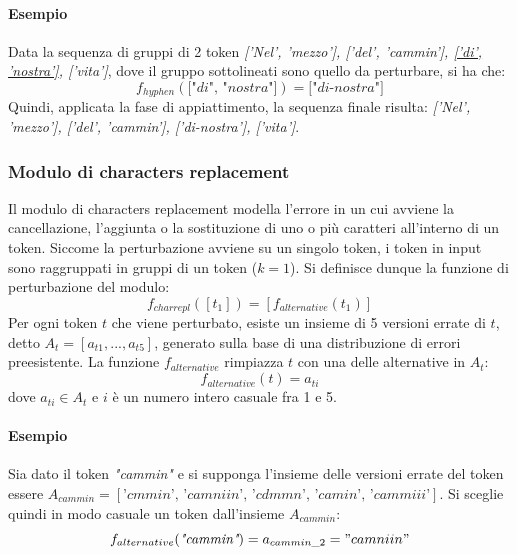 \paragraph{Esempio} Data la sequenza di gruppi di 2 token \textit{['Nel', 'mezzo'], ['del', 'cammin'], \underline{['di', 'nostra']}, ['vita']}, dove il gruppo sottolineati sono quello da perturbare, si ha che:
\begin{equation}
f_{hyphen}(\textit{["di", "nostra"]}) = \textit{["di-nostra"]}
\end{equation}
Quindi, applicata la fase di appiattimento, la sequenza finale risulta: \textit{['Nel', 'mezzo'], ['del', 'cammin'], {['di-nostra']}, ['vita']}.

\subsubsection{Modulo di characters replacement}
Il modulo di characters replacement modella l'errore in un cui avviene la cancellazione, l'aggiunta o la sostituzione di uno o più caratteri all'interno di un token. Siccome la perturbazione avviene su un singolo token, i token in input sono raggruppati in gruppi di un token ($k = 1$). Si definisce dunque la funzione di perturbazione del modulo:
\begin{equation}
f_{charrepl}([t_1]) = [f_{alternative}(t_1)]
\end{equation}
Per ogni token $t$ che viene perturbato, esiste un insieme di 5 versioni errate di $t$, detto $A_t = [a_{t1},...,a_{t5}]$, generato sulla base di una distribuzione di errori preesistente. La funzione $f_{alternative}$ rimpiazza $t$ con una delle alternative in $A_t$:
\begin{equation}
f_{alternative}(t) = a_{ti}
\end{equation}
dove $a_{ti} \in A_t$ e $i$ è un numero intero casuale fra 1 e 5.

\paragraph{Esempio} Sia dato il token \textit{"cammin"} e si supponga l'insieme delle versioni errate del token essere $A_{cammin} = [\textit{'cmmin', 'camniin', 'cdmmn', 'camin', 'cammiii'}]$. Si sceglie quindi in modo casuale un token dall'insieme $A_{cammin}$:
\begin{equation}
f_{alternative}(\textit{"cammin"}) = a_{cammin\_2} ="camniin"
\end{equation}


